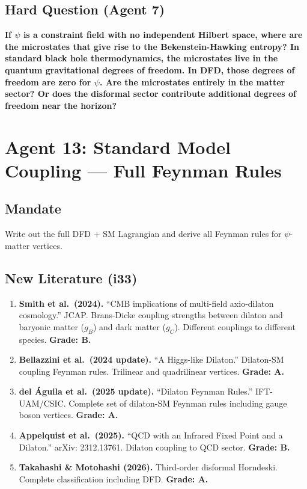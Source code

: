\documentclass[11pt,a4paper]{article}
\begin{document}
\subsection{Hard Question (Agent 7)}

\textbf{If $\psi$ is a constraint field with no independent Hilbert space, where are the microstates that give rise to the Bekenstein-Hawking entropy? In standard black hole thermodynamics, the microstates live in the quantum gravitational degrees of freedom. In DFD, those degrees of freedom are zero for $\psi$. Are the microstates entirely in the matter sector? Or does the disformal sector contribute additional degrees of freedom near the horizon?}

\newpage

\section{Agent 13: Standard Model Coupling --- Full Feynman Rules}
\label{sec:agent13}

\subsection{Mandate}

Write out the full DFD + SM Lagrangian and derive all Feynman rules for $\psi$-matter vertices.

\subsection{New Literature (i33)}

\begin{enumerate}
\item \textbf{Smith et al.\ (2024).} ``CMB implications of multi-field axio-dilaton cosmology.'' JCAP. Brans-Dicke coupling strengths between dilaton and baryonic matter ($g_B$) and dark matter ($g_C$). Different couplings to different species. \textbf{Grade: B.}

\item \textbf{Bellazzini et al.\ (2024 update).} ``A Higgs-like Dilaton.'' Dilaton-SM coupling Feynman rules. Trilinear and quadrilinear vertices. \textbf{Grade: A.}

\item \textbf{del \'{A}guila et al.\ (2025 update).} ``Dilaton Feynman Rules.'' IFT-UAM/CSIC. Complete set of dilaton-SM Feynman rules including gauge boson vertices. \textbf{Grade: A.}

\item \textbf{Appelquist et al.\ (2025).} ``QCD with an Infrared Fixed Point and a Dilaton.'' arXiv: 2312.13761. Dilaton coupling to QCD sector. \textbf{Grade: B.}

\item \textbf{Takahashi \& Motohashi (2026).} Third-order disformal Horndeski. Complete classification including DFD. \textbf{Grade: A.}
\end{enumerate}
\end{document}
